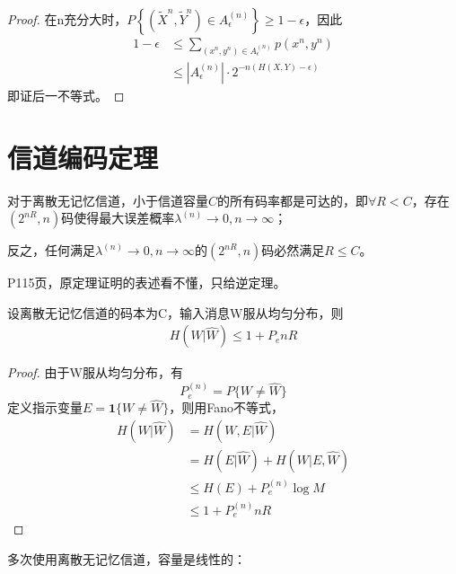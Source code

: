 \documentclass{ctexbook}
\begin{document}
\begin{proof}
    在n充分大时，$P\left\{\left(\tilde{X}^n,\tilde{Y}^n\right)\in A^{(n)}_{\epsilon}\right\}\geq 1-\epsilon$，因此\begin{align*}
        1-\epsilon&\leq\sum_{(x^n,y^n)\in A^{(n)}_{\epsilon}}p(x^n,y^n)\\
        &\leq |A^{(n)}_{\epsilon}|\cdot 2^{-n(H(X,Y)-\epsilon)}
    \end{align*}
    即证后一不等式。
\end{proof}

\section{信道编码定理}

\begin{theorem}
    对于离散无记忆信道，小于信道容量$C$的所有码率都是可达的，即$\forall R<C$，存在$(2^{nR},n)$码使得最大误差概率$\lambda^{(n)}\to 0,n\to\infty$；
    
    反之，任何满足$\lambda^{(n)}\to 0,n\to\infty$的$(2^{nR},n)$码必然满足$R\leq C$。
\end{theorem}

P115页，原定理证明的表述看不懂，只给逆定理。

\begin{lemma}[Fano不等式]
    设离散无记忆信道的码本为C，输入消息W服从均匀分布，则\begin{align*}
        H(W|\hat{W})\leq 1+P_e nR
    \end{align*}
\end{lemma}
\begin{proof}
    由于W服从均匀分布，有
    $$P_e^{(n)}=P\{W\neq \hat{W}\}$$
    定义指示变量$E=\mathbf{1}\{W\neq \hat{W}\}$，则用Fano不等式，\begin{align*}
        H(W|\hat{W})&=H(W,E|\hat{W})\\
        &=H(E|\hat{W})+H(W|E,\hat{W})\\
        &\leq H(E)+P_e^{(n)}\log M\\
        &\leq 1+P_e^{(n)} nR
    \end{align*}
\end{proof}

多次使用离散无记忆信道，容量是线性的：
\end{document}

